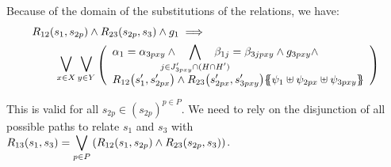 \documentclass[runningheads]{llncs}
\begin{document}
\begin{enumerate}
Because of the domain of the substitutions of the relations, we have:
\begin{align*}
R_{12}\mpar{s_1, s_{2p}} \wedge R_{23}\mpar{s_{2p},s_3} \wedge g_1 \implies 
\hspace{5.5cm}\\
\operatorname*{\bigsymb{\bigvee}}_{x \in X} 
\operatorname*{\bigsymb{\bigvee}}_{y \in Y}
\mpar{\everymath{\displaystyle}
\begin{array}{l}
\alpha_1=\alpha_{3pxy}\wedge \bigwedge_\subbox{j \in J'_{3pxy} \cap (H\cap H')} \beta_{1j}=\beta_{3jpxy} \wedge g_{3pxy}\wedge \\
R_{12}\mpar{s'_1, s'_{2px}} \wedge R_{23}\mpar{s'_{2px}, s'_{3pxy}}\psubst{\psi_1 \uplus \psi_{2px} \uplus \psi_{3pxy}}
\end{array}}
\end{align*}	

This is valid for all $s_{2p} \in (s_{2p})^{p\in P}$. We need to rely on the disjunction of all possible paths to relate $s_1$ and $s_3$ with ${\displaystyle R_{13}(s_1,s_3)=\bigvee_{{p\in P}}{\left(R_{12}{\left(s_1,s_{2p}\right)} \wedge R_{23}{\left(s_{2p},s_3\right)}\right)}}$.


\end{enumerate}
\end{document}
